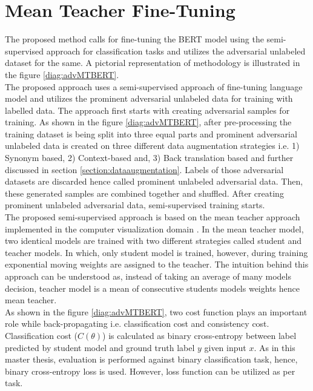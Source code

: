 \documentclass[%
	BCOR=8mm, %
	DIV=12,
	toc=bibliography, %
	toc=listof, %
	oneside, %
	egregdoesnotlikesansseriftitles, %
	]{scrbook}
\begin{document}
\section{Mean Teacher Fine-Tuning}
\label{section:Meanteacher}
The proposed method calls for fine-tuning the BERT model using the semi-supervised approach for classification tasks and utilizes the adversarial unlabeled dataset for the same. A pictorial representation of methodology is illustrated in the figure \ref{diag:advMTBERT}.\\
The proposed approach uses a semi-supervised approach of fine-tuning language model and utilizes the prominent adversarial unlabeled data for training with labelled data. The approach first starts with creating adversarial samples for training. As shown in the figure \ref{diag:advMTBERT}, after pre-processing the training dataset is being split into three equal parts and prominent adversarial unlabeled data is created on three different data augmentation strategies i.e. 1) Synonym based, 2) Context-based and, 3) Back translation based and further discussed in section \ref{section:dataaugmentation}. Labels of those adversarial datasets are discarded hence called prominent unlabeled adversarial data. Then, these generated samples are combined together and shuffled. After creating prominent unlabeled adversarial data, semi-supervised training starts.\\
The proposed semi-supervised approach is based on the mean teacher approach implemented in the computer visualization domain \cite{tarvainen_mean_2018}. In the mean teacher model, two identical models are trained with two different strategies called student and teacher models. In which, only student model is trained, however, during training exponential moving weights are assigned to the teacher. The intuition behind this approach can be understood as, instead of taking an average of many models decision, teacher model is a mean of consecutive students models weights hence mean teacher. \\
As shown in the figure \ref{diag:advMTBERT}, two cost function plays an important role while back-propagating i.e. classification cost and consistency cost. Classification cost ($C(\theta)$) is calculated as binary cross-entropy between label predicted by student model and ground truth label $y$ given input $x$.  As in this master thesis, evaluation is performed against binary classification task, hence, binary cross-entropy loss is used. However, loss function can be utilized as per task.\\
\end{document}
